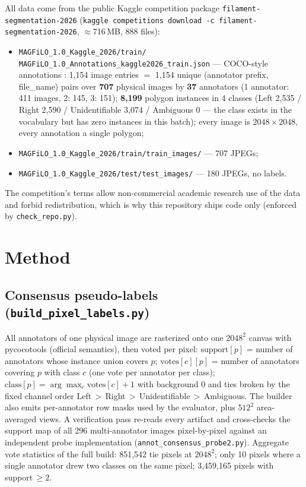 \documentclass[11pt]{article}
\begin{document}
All data come from the public Kaggle competition package
\texttt{filament-segmentation-2026} (\texttt{kaggle competitions download
-c filament-segmentation-2026}, $\approx$716\,MB, 888 files):
\begin{itemize}
\item \texttt{MAGFiLO\_1.0\_Kaggle\_2026/train/\\
      MAGFiLO\_1.0\_Annotations\_kaggle2026\_train.json} --- COCO-style
      annotations \cite{magfilo}: 1{,}154 image entries
      $=$ 1{,}154 unique (annotator prefix, file\_name) pairs over
      \textbf{707} physical images by \textbf{37} annotators
      (1 annotator: 411 images, 2: 145, 3: 151); \textbf{8{,}199} polygon
      instances in 4 classes (Left 2{,}535 / Right 2{,}590 /
      Unidentifiable 3{,}074 / Ambiguous 0 --- the class exists in the
      vocabulary but has zero instances in this batch); every image is
      $2048\times2048$, every annotation a single polygon;
\item \texttt{MAGFiLO\_1.0\_Kaggle\_2026/train/train\_images/} ---
      707 JPEGs;
\item \texttt{MAGFiLO\_1.0\_Kaggle\_2026/test/test\_images/} ---
      180 JPEGs, no labels.
\end{itemize}
The competition's terms allow non-commercial academic research use of the
data and forbid redistribution, which is why this repository ships code
only (enforced by \texttt{check\_repo.py}).

\section{Method}
\label{sec:method}

\subsection{Consensus pseudo-labels (\texttt{build\_pixel\_labels.py})}
All annotators of one physical image are rasterized onto one
$2048^2$ canvas with pycocotools (official semantics), then voted
per pixel:
$\mathrm{support}[p]$ = number of annotators whose instance union covers
$p$; $\mathrm{votes}[c][p]$ = number of annotators covering $p$ with class
$c$ (one vote per annotator per class); $\mathrm{class}[p] =
\arg\max_c \mathrm{votes}[c]+1$ with background $0$ and ties broken by the
fixed channel order Left\,$>$\,Right\,$>$\,Unidentifiable\,$>$\,Ambiguous.
The builder also emits per-annotator row masks used by the evaluator, plus
$512^2$ area-averaged views. A verification pass re-reads every artifact
and cross-checks the support map of all 296 multi-annotator images
pixel-by-pixel against an independent probe implementation
(\texttt{annot\_consensus\_probe2.py}). Aggregate vote statistics of the
full build: 851{,}542 tie pixels at $2048^2$; only 10 pixels where a
single annotator drew two classes on the same pixel; 3{,}459{,}165 pixels
with support\,$\ge 2$.
\end{document}
